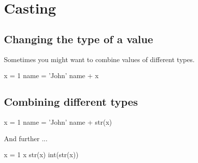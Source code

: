 \documentclass[aspectratio=1610,slidestop]{beamer}
\begin{document}
\section{Casting}
\subsection{Changing the type of a value}
\begin{pframe}
Sometimes you might want to combine values of different types.
\begin{pyconsole}
x = 1
name = 'John'
name + x
\end{pyconsole}
\end{pframe}


\subsection{Combining different types}
\begin{pframe}
\begin{pyconsole}
x = 1
name = 'John'
name + str(x)
\end{pyconsole}
\medskip
\medskip
And further ...
\begin{pyconsole}
x = 1
x
str(x)
int(str(x))
\end{pyconsole}
\end{pframe}
\end{document}
